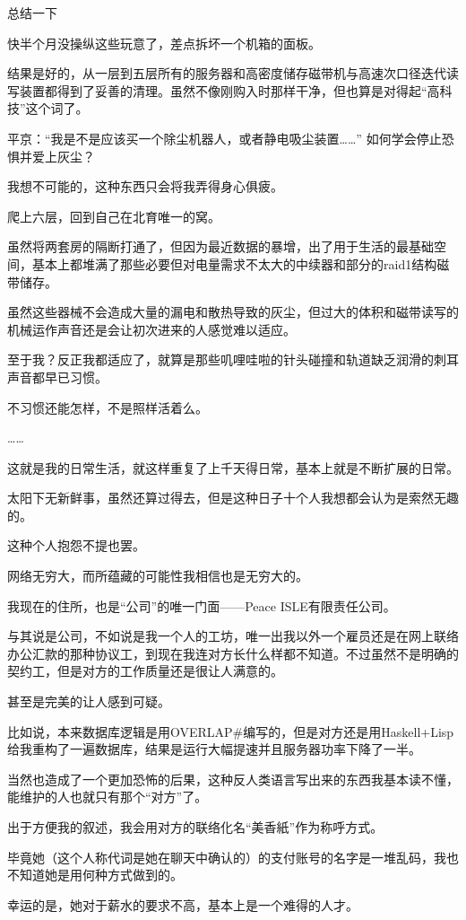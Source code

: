 总结一下

快半个月没操纵这些玩意了，差点拆坏一个机箱的面板。

结果是好的，从一层到五层所有的服务器和高密度储存磁带机与高速次口径迭代读写装置都得到了妥善的清理。虽然不像刚购入时那样干净，但也算是对得起“高科技”这个词了。

平京：“我是不是应该买一个除尘机器人，或者静电吸尘装置……”
如何学会停止恐惧并爱上灰尘？

我想不可能的，这种东西只会将我弄得身心俱疲。

爬上六层，回到自己在北育唯一的窝。

虽然将两套房的隔断打通了，但因为最近数据的暴增，出了用于生活的最基础空间，基本上都堆满了那些必要但对电量需求不太大的中续器和部分的raid1结构磁带储存。

虽然这些器械不会造成大量的漏电和散热导致的灰尘，但过大的体积和磁带读写的机械运作声音还是会让初次进来的人感觉难以适应。

至于我？反正我都适应了，就算是那些叽哩哇啦的针头碰撞和轨道缺乏润滑的刺耳声音都早已习惯。

不习惯还能怎样，不是照样活着么。

……

这就是我的日常生活，就这样重复了上千天得日常，基本上就是不断扩展的日常。

太阳下无新鲜事，虽然还算过得去，但是这种日子十个人我想都会认为是索然无趣的。

这种个人抱怨不提也罢。

网络无穷大，而所蕴藏的可能性我相信也是无穷大的。

我现在的住所，也是“公司”的唯一门面——Peace ISLE有限责任公司。

与其说是公司，不如说是我一个人的工坊，唯一出我以外一个雇员还是在网上联络办公汇款的那种协议工，到现在我连对方长什么样都不知道。不过虽然不是明确的契约工，但是对方的工作质量还是很让人满意的。

甚至是完美的让人感到可疑。

比如说，本来数据库逻辑是用OVERLAP\#编写的，但是对方还是用Haskell+Lisp给我重构了一遍数据库，结果是运行大幅提速并且服务器功率下降了一半。

当然也造成了一个更加恐怖的后果，这种反人类语言写出来的东西我基本读不懂，能维护的人也就只有那个“对方”了。

出于方便我的叙述，我会用对方的联络化名“美香紙”作为称呼方式。

毕竟她（这个人称代词是她在聊天中确认的）的支付账号的名字是一堆乱码，我也不知道她是用何种方式做到的。

幸运的是，她对于薪水的要求不高，基本上是一个难得的人才。

